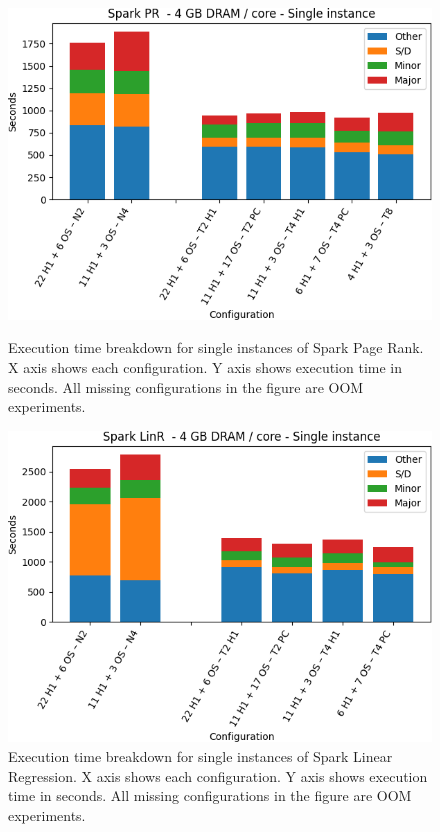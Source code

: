 \begin{figure}[thbp]
\centering
    \includegraphics[width=\linewidth]{./fig/pr64_single.png}
    \caption{ Execution time breakdown for single instances of Spark
	Page Rank. X axis shows each configuration. Y axis shows execution time in seconds. All missing configurations in the figure are OOM experiments.}
    \label{fig:pr64_single}
	\includegraphics[width=\linewidth]{./fig/linr64_single.png}
    \caption{Execution time breakdown for single instances of Spark
	Linear Regression. X axis shows each configuration. Y axis shows execution time in seconds. All missing configurations in the figure are OOM experiments.}
    \label{fig:linr64_single}
\end{figure}

